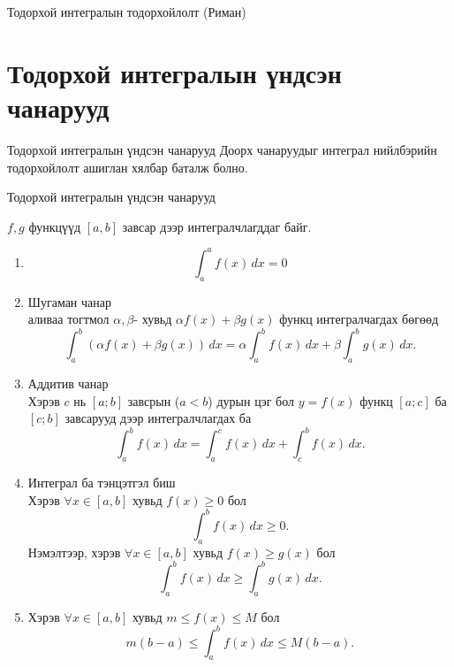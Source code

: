 \begin{frame}[allowframebreaks]{Тодорхой интегралын тодорхойлолт (Риман)}
\begin{example}
\begin{center}
\begin{fitbox}
\end{fitbox}
\end{center}

\end{example}
\end{frame}

\section{Тодорхой интегралын үндсэн чанарууд}
\begin{frame}[allowframebreaks]{Тодорхой интегралын үндсэн чанарууд}
Доорх чанаруудыг интеграл нийлбэрийн тодорхойлолт ашиглан хялбар баталж болно.
\end{frame}

\begin{frame}[allowframebreaks]{Тодорхой интегралын үндсэн чанарууд}
\begin{theorem}
 $f,g$ функцүүд $[a,b]$ завсар дээр интегралчлагддаг байг.
\begin{enumerate}
\item \[
\int_a^a f(x)\,dx
=0
\]
    \item Шугаман чанар\\
аливаа тогтмол $\alpha,\beta$- хувьд $\alpha f(x)+\beta g(x)$ функц интегралчагдах бөгөөд
\[
\int_a^b (\alpha f(x)+\beta g(x))\,dx
=
\alpha\int_a^b f(x)\,dx + \beta\int_a^b g(x)\,dx.
\]
\item Аддитив чанар\\
Хэрэв $c$ нь $[a;b]$  завсрын ($a<b$) дурын цэг бол $y=f(x)$ функц $[a;c]$ ба $[c;b]$ завсарууд дээр интегралчлагдах ба 
\[
\int_a^b f(x)\,dx
=
\int_a^c f(x)\,dx + \int_c^b f(x)\,dx.
\]
\item Интеграл ба тэнцэтгэл биш \\
Хэрэв  $\forall x\in[a,b]$ хувьд $f(x)\ge 0$ бол
\[
\int_a^b f(x)\,dx \ge 0.
\]
Нэмэлтээр, хэрэв $\forall x\in[a,b]$ хувьд $f(x)\ge g(x)$  бол
\[
\int_a^b f(x)\,dx \ge \int_a^b g(x)\,dx.
\]
\item 
Хэрэв $\forall x\in[a,b]$ хувьд $m\le f(x)\le M$  бол
\[
m(b-a) \le \int_a^b f(x)\,dx \le M(b-a).
\]
\end{enumerate}
\end{theorem}
\end{frame}

